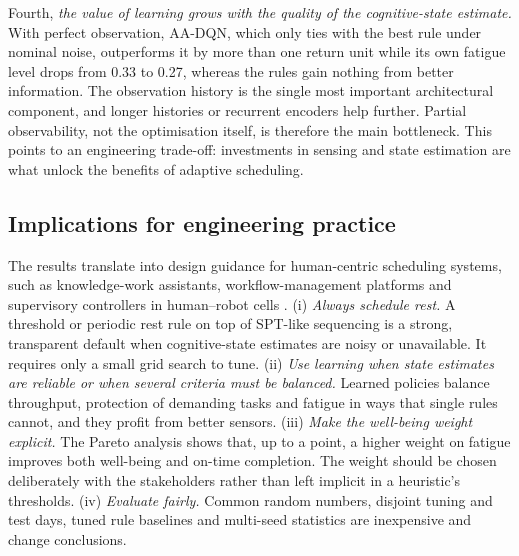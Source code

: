 Fourth, \emph{the value of learning grows with the quality of the cognitive-state estimate.} With perfect observation, AA-DQN, which only ties with the best rule under nominal noise, outperforms it by more than one return unit while its own fatigue level drops from 0.33 to 0.27, whereas the rules gain nothing from better information. The observation history is the single most important architectural component, and longer histories or recurrent encoders help further. Partial observability, not the optimisation itself, is therefore the main bottleneck. This points to an engineering trade-off: investments in sensing and state estimation are what unlock the benefits of adaptive scheduling.

\subsection{Implications for engineering practice}
The results translate into design guidance for human-centric scheduling systems, such as knowledge-work assistants, workflow-management platforms and supervisory controllers in human--robot cells \cite{lu2022,leng2022,ajoudani2018}.
(i) \emph{Always schedule rest.} A threshold or periodic rest rule on top of SPT-like sequencing is a strong, transparent default when cognitive-state estimates are noisy or unavailable. It requires only a small grid search to tune.
(ii) \emph{Use learning when state estimates are reliable or when several criteria must be balanced.} Learned policies balance throughput, protection of demanding tasks and fatigue in ways that single rules cannot, and they profit from better sensors. 
(iii) \emph{Make the well-being weight explicit.} The Pareto analysis shows that, up to a point, a higher weight on fatigue improves both well-being and on-time completion. The weight should be chosen deliberately with the stakeholders rather than left implicit in a heuristic's thresholds.
(iv) \emph{Evaluate fairly.} Common random numbers, disjoint tuning and test days, tuned rule baselines and multi-seed statistics are inexpensive and change conclusions.




